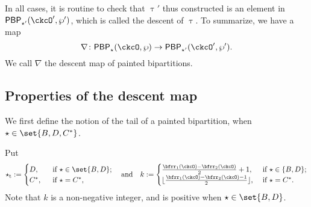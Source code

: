 \documentclass[12pt]{amsart}
\def\DD{\nabla}
\numberwithin{equation}{section}
\newtheorem{prop}[thm]{Proposition}
\theoremstyle{remark}
\def\DD{\nabla}
\def\CPPs{\mathrm{PP}_{\star}}
\def\PBP{\mathsf{PBP}}
\def\PBPop#1#2#3#4{\PBP_{#1}^{#2}(#3,#4)}
\newcommand{\PBPOP}[1][]{\PBPop{\star}{#1}{\ckcO}{\wp}}
\def\PBPOPp{\PBPop{\star'}{}{\ckcO'}{\wp'}}
\def\ckDD{{\check\DD}}
\def\DD{\nabla}
\begin{document}
\medskip
In all cases, it is routine to check that $\uptau'$ thus constructed is an element in $\PBPOPp$, which is called the descent of $\uptau$.
To summarize, we have a map
  \begin{equation}
    \label{eq:DD.CC}
    \DD \colon \PBPOP \rightarrow \PBPOPp.
  \end{equation}
We call $\DD$ the descent map of painted bipartitions.


\subsection{Properties of the descent map}


We first define the notion of the tail of a painted bipartition, when $\star\in\set{B, D, C^*}$.


\def\startt{\star_{\mathrm t}}
Put
\[
  \startt:= \begin{cases}
  D, & \ \text{ if $\star\in \set{B,D}$}; \\
  C^*, &\  \text{ if $\star=C^*$},
\end{cases}
\quad
\textrm{and}\quad
k := \begin{cases}
  \frac{\bfrr_{1}(\ckcO)-\bfrr_{2}(\ckcO)}{2} + 1, &\
    \text{if $\star\in \{B,D\}$}; \\
\lfloor\frac{\bfrr_{1}(\ckcO)-\bfrr_{2}(\ckcO)-1}{2}\rfloor,  & \  \text{if $\star=C^*$}.
  \end{cases}
\]
Note that $k$ is a non-negative integer, and is positive when $\star \in \set{B,D}$.
\end{document}
